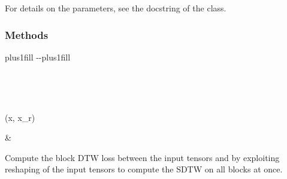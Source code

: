 \documentclass[letterpaper,10pt,english]{sphinxmanual}
\begin{document}
\begin{fulllineitems}
\sphinxAtStartPar
For details on the parameters, see the docstring of the {\hyperref[\detokenize{dtw_loss_functions.block_dtw:dtw_loss_functions.block_dtw.block_dtw}]{}} class.
\subsubsection*{Methods}


\begin{savenotes}
\sphinxatlongtablestart
\sphinxthistablewithglobalstyle
\sphinxthistablewithnovlinesstyle
\makeatletter
  \LTleft \@totalleftmargin plus1fill
  \LTright\dimexpr\columnwidth-\@totalleftmargin-\linewidth\relax plus1fill
\makeatother
\begin{longtable}{}
\sphinxtoprule
\endfirsthead

\\
\sphinxtoprule
\endhead

\sphinxbottomrule
{}\\
\endfoot

\endlastfoot
\sphinxtableatstartofbodyhook
\begin{varwidth}[t]{}
\sphinxAtStartPar
{\hyperref[\detokenize{dtw_loss_functions.block_dtw:dtw_loss_functions.block_dtw.block_dtw_optimized.forward}]{}}(x, x\_r)
\sphinxbeforeendvarwidth
\end{varwidth}%
&\begin{varwidth}[t]{}
\sphinxAtStartPar
Compute the block DTW loss between the input tensors  and  by exploiting reshaping of the input tensors to compute the SDTW on all blocks at once.
\sphinxbeforeendvarwidth
\end{varwidth}%
\\
\sphinxbottomrule
\end{longtable}
\sphinxtableafterendhook
\sphinxatlongtableend
\end{savenotes}


\end{fulllineitems}
\end{document}

